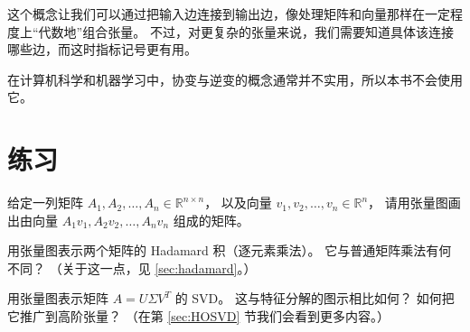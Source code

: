 这个概念让我们可以通过把输入边连接到输出边，像处理矩阵和向量那样在一定程度上“代数地”组合张量。
不过，对更复杂的张量来说，我们需要知道具体该连接哪些边，而这时指标记号更有用。

在计算机科学和机器学习中，协变与逆变的概念通常并不实用，所以本书不会使用它。

\section{练习}
\begin{exercise}
   给定一列矩阵 $A_1, A_2, \ldots, A_n \in \mathbb R^{n\times n}$，
   以及向量 $v_1, v_2, \ldots, v_n \in \mathbb R^n$，
   请用张量图画出由向量 $A_1v_1, A_2v_2, \ldots, A_nv_n$ 组成的矩阵。
\end{exercise}
\begin{exercise}
用张量图表示两个矩阵的 Hadamard 积（逐元素乘法）。
它与普通矩阵乘法有何不同？
（关于这一点，见 \ref{sec:hadamard}。）
\end{exercise}
\begin{exercise}
用张量图表示矩阵 $A = U\Sigma V^T$ 的 SVD。
这与特征分解的图示相比如何？
如何把它推广到高阶张量？
（在第 \ref{sec:HOSVD} 节我们会看到更多内容。）
\end{exercise}
